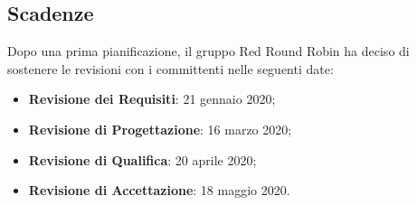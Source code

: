 	\subsection{Scadenze}
	\label{riferimento_scadenze}
		Dopo una prima pianificazione, il gruppo Red Round Robin ha deciso di sostenere le revisioni con i committenti nelle seguenti date:
		\begin{itemize}
			\item \textbf{Revisione dei Requisiti}: 21 gennaio 2020;
			\item \textbf{Revisione di Progettazione}: 16 marzo 2020;
			\item \textbf{Revisione di Qualifica}: 20 aprile 2020;
			\item \textbf{Revisione di Accettazione}: 18 maggio 2020.
		\end{itemize}
		
